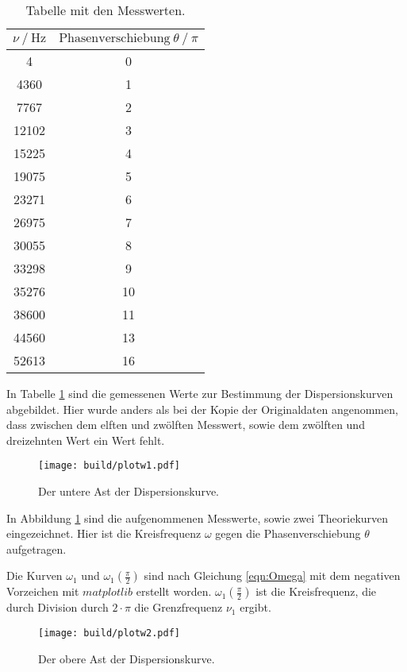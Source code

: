 \begin{table}
  \centering
  \caption{Tabelle mit den Messwerten.}
  \label{tab:wertedis}
  \begin{tabular}{c c}
    \toprule
     $\nu \ /\ \si{\hertz}$ & $\text{Phasenverschiebung}~\theta \ /\ \pi$\\
    \midrule
    4 & 0\\
    4360 & 1\\
    7767 & 2\\
    12102 & 3\\
    15225 & 4\\
    19075 & 5\\
    23271 & 6\\
    26975 & 7\\
    30055 & 8\\
    33298 & 9\\
    35276 & 10\\
    38600 & 11\\
    44560 & 13\\
    52613 & 16\\
    \bottomrule
  \end{tabular}
\end{table}

In Tabelle \ref{tab:wertedis} sind die gemessenen Werte zur Bestimmung der
Dispersionskurven abgebildet. Hier wurde anders als bei der Kopie der
Originaldaten angenommen, dass zwischen dem elften und zwölften Messwert,
sowie dem zwölften und dreizehnten Wert ein Wert fehlt.

\begin{figure}
  \centering
  \texttt{[image: build/plotw1.pdf]}
  \caption{Der untere Ast der Dispersionskurve.}
  \label{fig:astw1}
\end{figure}

In Abbildung \ref{fig:astw1} sind die aufgenommenen Messwerte, sowie zwei
Theoriekurven eingezeichnet. Hier ist die Kreisfrequenz $\omega$ gegen die
Phasenverschiebung
$\theta$ aufgetragen.

Die Kurven $\omega_1$ und $\omega_1(\frac{\pi}{2})$ sind nach Gleichung
\eqref{eqn:Omega} mit dem negativen
Vorzeichen mit $matplotlib$ \cite{matplotlib} erstellt worden.
$\omega_1(\frac{\pi}{2})$ ist die Kreisfrequenz, die durch Division durch
$2\cdot\pi$ die Grenzfrequenz $\nu_1$ ergibt.

\begin{figure}
  \centering
  \texttt{[image: build/plotw2.pdf]}
  \caption{Der obere Ast der Dispersionskurve.}
  \label{fig:astw2}
\end{figure}

